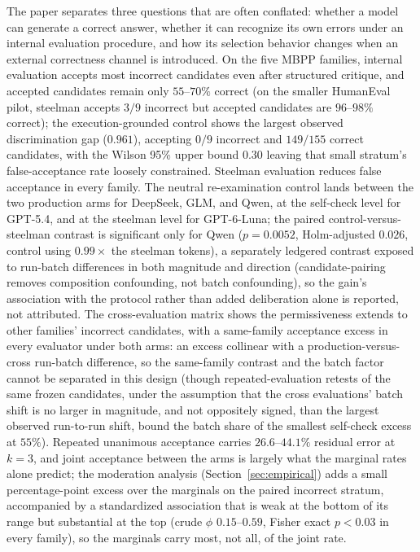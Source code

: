 \documentclass[a4paper,journal]{IAENGtran}
\begin{document}
The paper separates three questions that are often conflated: whether a model can
generate a correct answer, whether it can recognize its own errors under an internal
evaluation procedure, and how its selection behavior changes when an external
correctness channel is introduced. On the five MBPP
families, internal evaluation accepts most incorrect candidates even after structured
critique, and accepted candidates remain only $55$--$70\%$ correct (on the smaller
HumanEval pilot, steelman accepts $3/9$ incorrect but accepted candidates are
$96$--$98\%$ correct); the execution-grounded control shows the largest observed
discrimination gap ($0.961$), accepting $0/9$ incorrect and $149/155$ correct
candidates, with the Wilson 95\% upper bound $0.30$ leaving that small stratum's
false-acceptance rate loosely constrained. Steelman evaluation
reduces false acceptance in every family. The neutral
re-examination control lands between the two production arms for DeepSeek, GLM,
and Qwen, at the self-check level for GPT-5.4, and at the steelman level for
GPT-6-Luna; the paired control-versus-steelman contrast is significant only for
Qwen ($p=0.0052$, Holm-adjusted $0.026$, control using $0.99\times$ the steelman
tokens), a separately
ledgered contrast exposed to run-batch differences in both magnitude and direction
(candidate-pairing removes composition confounding, not batch confounding), so the
gain's association with the protocol rather than added deliberation alone is
reported, not attributed. The cross-evaluation matrix shows the permissiveness extends to other
families' incorrect candidates, with a same-family
acceptance excess in every evaluator under both arms: an excess collinear with a production-versus-cross run-batch difference, so
the same-family contrast and the batch factor cannot be separated in this design
(though repeated-evaluation retests of the same frozen candidates, under the
assumption that the cross evaluations' batch shift is no larger in magnitude, and not
oppositely signed, than the largest observed run-to-run shift,
bound the batch share of the smallest self-check excess at $55\%$). Repeated unanimous acceptance carries $26.6$--$44.1\%$ residual
error at $k{=}3$, and joint acceptance between the arms is largely what the marginal
rates alone predict; the moderation analysis (Section~\ref{sec:empirical}) adds a small percentage-point excess
over the marginals on the paired incorrect stratum, accompanied by a standardized
association that is weak at the bottom of its range but substantial at the top
(crude $\phi$ $0.15$--$0.59$, Fisher exact $p<0.03$
in every family), so the marginals carry
most, not all, of the joint rate.
\end{document}

